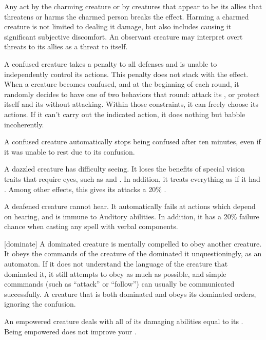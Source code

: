   Any act by the charming creature or by creatures that appear to be its allies that threatens or harms the charmed person breaks the effect.
  Harming a charmed creature is not limited to dealing it damage, but also includes causing it significant subjective discomfort.
  An observant creature may interpret overt threats to its allies as a threat to itself.

   A confused creature takes a  penalty to all defenses and is unable to independently control its actions.
  This penalty does not stack with the \stunned effect.
  When a creature becomes confused, and at the beginning of each round, it randomly decides to have one of two behaviors that round: attack its , or protect itself and its  without attacking.
  Within those constraints, it can freely choose its actions.
  If it can't carry out the indicated action, it does nothing but babble incoherently.

  A confused creature automatically stops being confused after ten minutes, even if it was unable to rest due to its confusion.

   A dazzled creature has difficulty seeing.
  It loses the benefits of special vision traits that require eyes, such as  and .
  In addition, it treats everything as if it had .
  Among other effects, this gives its  attacks a 20\% .

   A deafened creature cannot hear.
  It automatically fails at actions which depend on hearing, and is immune to Auditory abilities.
  In addition, it has a 20\% failure chance when casting any spell with verbal components.

  [dominate] A dominated creature is mentally compelled to obey another creature.
  It obeys the commands of the creature of the dominated it unquestioningly, as an automaton.
  If it does not understand the language of the creature that dominated it, it still attempts to obey as much as possible, and simple commmands (such as ``attack'' or ``follow'') can usually be communicated successfully.
  A creature that is both dominated and \confused obeys its dominated orders, ignoring the confusion.

   An empowered creature deals  with all of its damaging abilities equal to its .
  Being empowered does not improve your .


